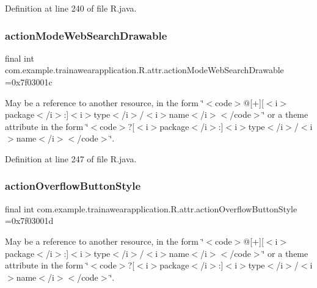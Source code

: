 Definition at line 240 of file R.\+java.

\mbox{\label{classcom_1_1example_1_1trainawearapplication_1_1_r_1_1attr_a1611b97df568c3837f805e88844057f2}} 
\subsubsection{\texorpdfstring{actionModeWebSearchDrawable}{actionModeWebSearchDrawable}}
{\footnotesize\ttfamily final int com.\+example.\+trainawearapplication.\+R.\+attr.\+action\+Mode\+Web\+Search\+Drawable =0x7f03001c\hspace{0.3cm}{\ttfamily [static]}}

May be a reference to another resource, in the form \char`\"{}$<$code$>$@\mbox{[}+\mbox{]}\mbox{[}$<$i$>$package$<$/i$>$\+:\mbox{]}$<$i$>$type$<$/i$>$/$<$i$>$name$<$/i$>$$<$/code$>$\char`\"{} or a theme attribute in the form \char`\"{}$<$code$>$?\mbox{[}$<$i$>$package$<$/i$>$\+:\mbox{]}$<$i$>$type$<$/i$>$/$<$i$>$name$<$/i$>$$<$/code$>$\char`\"{}. 

Definition at line 247 of file R.\+java.

\mbox{\label{classcom_1_1example_1_1trainawearapplication_1_1_r_1_1attr_a9eb889e4707a8cb14a5fd0233f21f2cd}} 
\subsubsection{\texorpdfstring{actionOverflowButtonStyle}{actionOverflowButtonStyle}}
{\footnotesize\ttfamily final int com.\+example.\+trainawearapplication.\+R.\+attr.\+action\+Overflow\+Button\+Style =0x7f03001d\hspace{0.3cm}{\ttfamily [static]}}

May be a reference to another resource, in the form \char`\"{}$<$code$>$@\mbox{[}+\mbox{]}\mbox{[}$<$i$>$package$<$/i$>$\+:\mbox{]}$<$i$>$type$<$/i$>$/$<$i$>$name$<$/i$>$$<$/code$>$\char`\"{} or a theme attribute in the form \char`\"{}$<$code$>$?\mbox{[}$<$i$>$package$<$/i$>$\+:\mbox{]}$<$i$>$type$<$/i$>$/$<$i$>$name$<$/i$>$$<$/code$>$\char`\"{}. 

